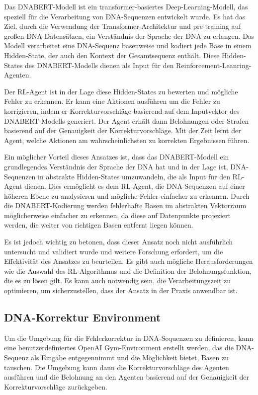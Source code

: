 \documentclass[oneside,bibliography=totocnumbered,BCOR=5mm]{scrbook}%
\theoremstyle{definition}
\theoremstyle{definition}
\theoremstyle{definition}
\theoremstyle{definition}
\theoremstyle{definition}
\theoremstyle{definition}
\begin{document}
Das DNABERT-Modell ist ein transformer-basiertes Deep-Learning-Modell, 
das speziell für die Verarbeitung von DNA-Sequenzen entwickelt wurde. 
Es hat das Ziel, durch die Verwendung der Transformer-Architektur und pre-training auf großen DNA-Datensätzen, 
ein Verständnis der Sprache der DNA zu erlangen. 
Das Modell verarbeitet eine DNA-Sequenz basenweise und kodiert jede Base in einem Hidden-State, 
der auch den Kontext der Gesamtsequenz enthält. 
Diese Hidden-States des DNABERT-Modells dienen als Input für den Reinforcement-Leanring-Agenten.


Der RL-Agent ist in der Lage diese Hidden-States zu bewerten und mögliche Fehler zu erkennen. 
Er kann eine Aktionen ausführen um die Fehler zu korrigieren, 
indem er Korrekturvorschläge basierend auf dem Inputvektor des DNABERT-Modells generiert. 
Der Agent erhält dann Belohnungen oder Strafen basierend auf der Genauigkeit der Korrekturvorschläge. 
Mit der Zeit lernt der Agent, welche Aktionen am wahrscheinlichsten zu korrekten Ergebnissen führen.


Ein möglicher Vorteil dieses Ansatzes ist, dass das DNABERT-Modell ein grundlegendes Verständnis der Sprache der DNA hat 
und in der Lage ist, DNA-Sequenzen in abstrakte Hidden-States umzuwandeln, die als Input für den RL-Agent dienen. 
Dies ermöglicht es dem RL-Agent, die DNA-Sequenzen auf einer höheren Ebene zu analysieren und mögliche Fehler 
einfacher zu erkennen. Durch die DNABERT-Kodierung werden fehlerhafte Basen im abstrakten Vektorraum
möglicherweise einfacher zu erkennen, da diese auf Datenpunkte projeziert werden, die weiter von
richtigen Basen entfernt liegen können.


Es ist jedoch wichtig zu betonen, dass dieser Ansatz noch nicht ausführlich untersucht und validiert wurde und 
weitere Forschung erfordert, um die Effektivität des Ansatzes zu beurteilen. 
Es gibt auch mögliche Herausforderungen wie die Auswahl des RL-Algorithmus und die Definition der Belohnungsfunktion, 
die es zu lösen gilt. 
Es kann auch notwendig sein, die Verarbeitungszeit zu optimieren, um sicherzustellen, dass der Ansatz in der Praxis anwendbar ist.


\subsection{DNA-Korrektur Environment}

Um die Umgebung für die Fehlerkorrektur in DNA-Sequenzen zu definieren, kann eine benutzerdefiniertes OpenAI
Gym-Environment erstellt werden, das die DNA-Sequenz als Eingabe entgegennimmt und die Möglichkeit bietet, 
Basen zu tauschen. 
Die Umgebung kann dann die Korrekturvorschläge des Agenten ausführen und die Belohnung an den Agenten basierend 
auf der Genauigkeit der Korrekturvorschläge zurückgeben.
\end{document}
